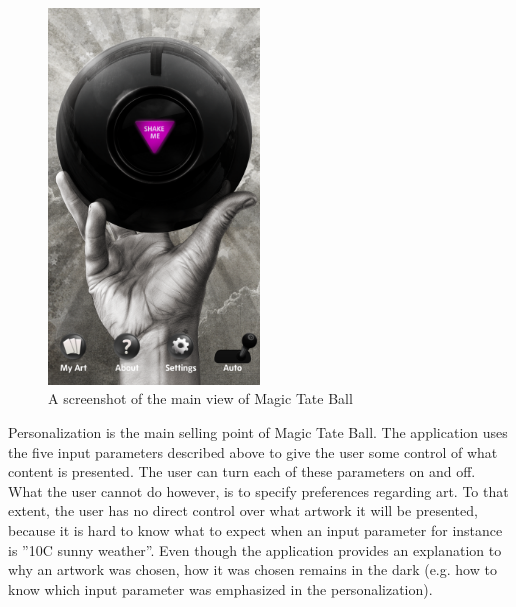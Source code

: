 \begin{figure}[h!]
	\centering
	\includegraphics[width=0.5\textwidth]{fig/tateball_screenshot}
	\caption{A screenshot of the main view of Magic Tate Ball}
	\label{tateball_screenshot}
\end{figure}

Personalization is the main selling point of Magic Tate Ball. The application uses the five input parameters described above to give the user some control of what content is presented. The user can turn each of these parameters on and off. What the user cannot do however, is to specify preferences regarding art. To that extent, the user has no direct control over what artwork it will be presented, because it is hard to know what to expect when an input parameter for instance is ”10\degree C sunny weather”. Even though the application provides an explanation to why an artwork was chosen, how it was chosen remains in the dark (e.g. how to know which input parameter was emphasized in the personalization).

\cleardoublepage
